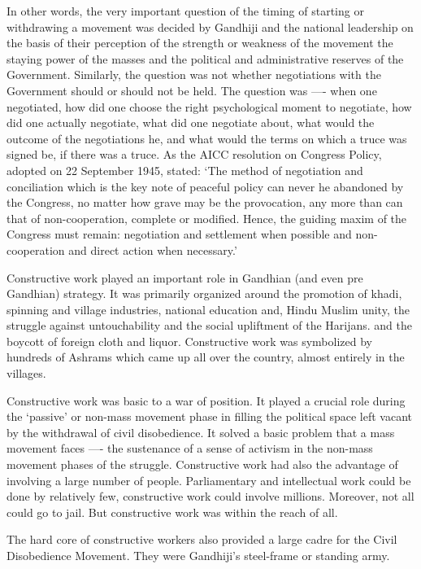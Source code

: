 In other words, the very important question of the timing of starting or withdrawing a movement was decided by Gandhiji and the national leadership on the basis of their perception of the strength or weakness of the movement the staying power of the masses and the political and administrative reserves of the Government. Similarly, the question was not whether negotiations with the Government should or should not be held. The question was —- when one negotiated, how did one choose the right psychological moment to negotiate, how did one actually negotiate, what did one negotiate about, what would the outcome of the negotiations he, and what would the terms on which a truce was signed be, if there was a truce. As the AICC resolution on Congress Policy, adopted on 22 September 1945, stated: `The method of negotiation and conciliation which is the key note of peaceful policy can never he abandoned by the Congress, no matter how grave may be the provocation, any more than can that of non-cooperation, complete or modified. Hence, the guiding maxim of the Congress must remain: negotiation and settlement when possible and non-cooperation and direct action when necessary.' 

Constructive work played an important role in Gandhian (and even pre Gandhian) strategy. It was primarily organized around the promotion of khadi, spinning and village industries, national education and, Hindu Muslim unity, the struggle against untouchability and the social upliftment of the Harijans. and the boycott of foreign cloth and liquor. Constructive work was symbolized by hundreds of Ashrams which came up all over the country, almost entirely in the villages. 

Constructive work was basic to a war of position. It played a crucial role during the `passive' or non-mass movement phase in filling the political space left vacant by the withdrawal of civil disobedience. It solved a basic problem that a mass movement faces —- the sustenance of a sense of activism in the non-mass movement phases of the struggle. Constructive work had also the advantage of involving a large number of people. Parliamentary and intellectual work could be done by relatively few, constructive work could involve millions. Moreover, not all could go to jail. But constructive work was within the reach of all. 

The hard core of constructive workers also provided a large cadre for the Civil Disobedience Movement. They were Gandhiji's steel-frame or standing army. 

